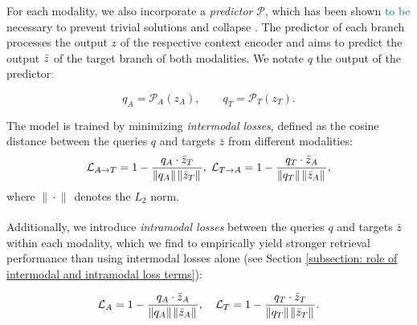\documentclass{article}
\newcommand{\norm}[2]{\| #2 \|_{_{#1}}}
\newcommand{\alain}[1]{\textcolor{magenta}{#1}}
\newcommand{\julien}[1]{\textcolor{teal}{#1}}
\begin{document}
For each modality, we also incorporate a \emph{predictor} $\mathcal{P}$,
which has been shown \julien{to be} necessary to prevent trivial solutions and collapse
\cite{grill2020bootstrap,Tian2021}.
The predictor of each branch processes the output $z$ of the respective context encoder and aims to predict the output $\Bar{z}$ of the target branch of both modalities.
We notate $q$ the output of the predictor\alain{:}

\begin{equation}
    q_A = \mathcal{P}_{A}(z_A), \qquad
    q_T = \mathcal{P}_{T}(z_T).
\end{equation}

The model is trained by minimizing \emph{intermodal losses}, defined as the cosine distance between the queries $q$ and targets $\bar{z}$ from different modalities:
\begin{equation}
    \mathcal{L}_{A \rightarrow T} = 1 - \frac{q_A \cdot \Bar{z}_T}{\norm{}{q_A} \norm{}{\Bar{z}_T}}, \;
    \mathcal{L}_{T \rightarrow A} = 1 - \frac{q_T \cdot \Bar{z}_A}{\norm{}{q_T} \norm{}{\Bar{z}_A}},
\end{equation}
where $\norm{}{\cdot}$ denotes the $L_2$ norm.

Additionally, we introduce \emph{intramodal losses} between the queries $q$ and targets $\bar{z}$ within each modality, which we find to empirically yield stronger retrieval performance than using intermodal losses alone (see Section \ref{subsection: role of intermodal and intramodal loss terms}):

\begin{equation}
    \mathcal{L}_{A} =  1 - \frac{q_A \cdot \Bar{z}_A}{\norm{}{q_A} \norm{}{\Bar{z}_A}}, \quad
    \mathcal{L}_{T} =  1 - \frac{q_T \cdot \Bar{z}_T}{\norm{}{q_T} \norm{}{\Bar{z}_T}}.
\end{equation}
\end{document}
